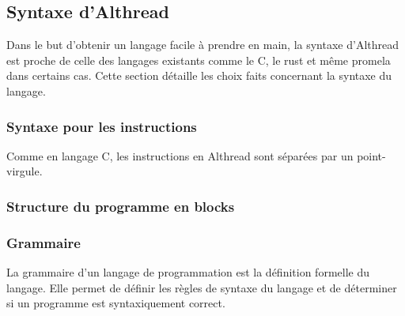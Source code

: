 \subsection{Syntaxe d'Althread}
Dans le but d'obtenir un langage facile à prendre en main, la syntaxe d'Althread est proche de celle des langages existants comme le C, le rust et même promela dans certains cas. Cette section détaille les choix faits concernant la syntaxe du langage.

\subsubsection{Syntaxe pour les instructions}
Comme en langage C, les instructions en Althread sont séparées par un point-virgule.
\subsubsection{Structure du programme en blocks}
\subsubsection{Grammaire}

La grammaire d'un langage de programmation est la définition formelle du langage. Elle permet de définir les règles de syntaxe du langage et de déterminer si un programme est syntaxiquement correct.